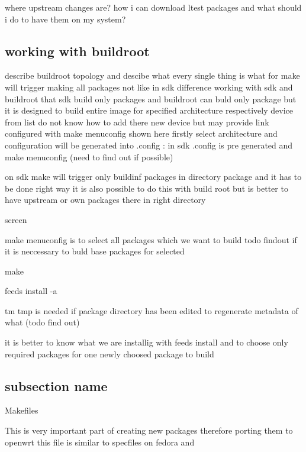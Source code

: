 where upstream changes are? how i can download ltest packages and what should i do to have them on my system?

\subsection{working with buildroot}

describe buildroot topology and descibe what every single thing is what for
make will trigger making all packages not like in sdk
difference working with sdk and buildroot that sdk build only packages and buildroot can buld only package but it is designed to build entire image
for specified architecture respectively device from list
do not know how to add there new device but may provide link
configured with make menuconfig shown here firstly select architecture and configuration will be generated into .config :
in sdk .config is pre generated and make menuconfig (need to find out if possible)

on sdk make will trigger only buildinf packages in directory package and it has to be done right way
it is also possible to do this with build root but is better to have upstream or own packages there in right directory

screen

make menuconfig is to select all packages which we want to build  todo findout if it is neccessary to buld base packages for selected

make

feeds install -a

tm tmp is needed if package directory has been edited to regenerate metadata of what (todo find out)

it is better to know what we are installig with feeds install and to choose only required packages for one newly choosed package to build

\subsection{subsection name}
{Makefiles}

This is very important part of creating new packages therefore porting them to openwrt this file is similar to specfiles on fedora and
